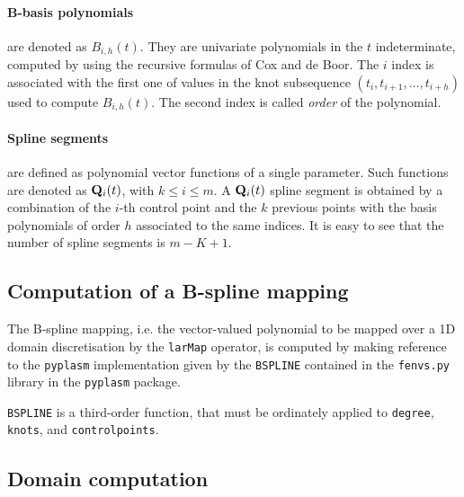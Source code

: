 \documentclass[11pt,oneside]{article}	%
\def\p#1{{\bf #1}}
\begin{document}
\paragraph{B-basis polynomials} \hspace{-2mm}are denoted as $B_{i,h}(t)$.  They are
univariate polynomials in the $t$ indeterminate, computed by using the
recursive formulas of Cox and de Boor.  The $i$ index is associated with
the first one of values in the knot subsequence
$(t_{i},t_{i+1},\ldots,t_{i+h})$ used to compute $B_{i,h}(t)$.  The
second index is called \emph{order} of the polynomial.

\paragraph{Spline segments} \hspace{-2mm}are defined as polynomial vector functions
of a single parameter.  Such functions are denoted as $\p{Q}_{i}(t)$,
with $k\leq i\leq m$.  A $\p{Q}_{i}(t)$ spline segment is obtained by a
combination of the $i$-th control point and the $k$ previous points
with the basis polynomials of order $h$ associated to the same
indices.  It is easy to see that the number of spline segments is
$m-K+1$.


\subsection{Computation of a B-spline mapping}

The B-spline mapping, i.e. the vector-valued polynomial to be mapped over a 1D domain
discretisation by the \texttt{larMap} operator, is computed by making reference to the 
\texttt{pyplasm} implementation given by the \texttt{BSPLINE} contained in the 
\texttt{fenvs.py} library in the \texttt{pyplasm} package.

\texttt{BSPLINE} is a third-order function, that must be ordinately applied to 
\texttt{degree}, \texttt{knots}, and \texttt{controlpoints}.


\subsection{Domain computation}
\end{document}
